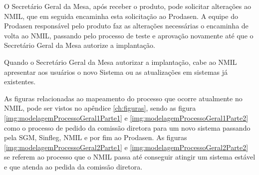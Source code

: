O Secretário Geral da Mesa, após receber o produto, pode solicitar alterações ao NMIL,
que em seguida encaminha esta solicitação ao Prodasen. A equipe do Prodasen responsável pelo produto faz as alterações necessárias o encaminha de volta ao NMIL, passando pelo processo de teste e aprovação novamente até que o Secretário Geral da Mesa autorize a implantação.

Quando o Secretário Geral da Mesa autorizar a implantação, cabe ao NMIL apresentar
aos usuários o novo Sistema ou as atualizações em sistemas já existentes.

As figuras relacionadas ao mapeamento do processo que ocorre atualmente no NMIL, pode ser vistos no apêndice \ref{ch:figuras}, sendo as figura \ref{img:modelagemProcessoGeral1Parte1} e \ref{img:modelagemProcessoGeral1Parte2} como o processo de pedido da comissão diretora para um novo sistema passando pela SGM, Sinfleg, NMIL e por fim ao Prodasen. As figuras \ref{img:modelagemProcessoGeral2Parte1} e \ref{img:modelagemProcessoGeral2Parte2} se referem ao processo que o NMIL passa até conseguir atingir um sistema estável e que atenda ao pedida da comissão diretora.